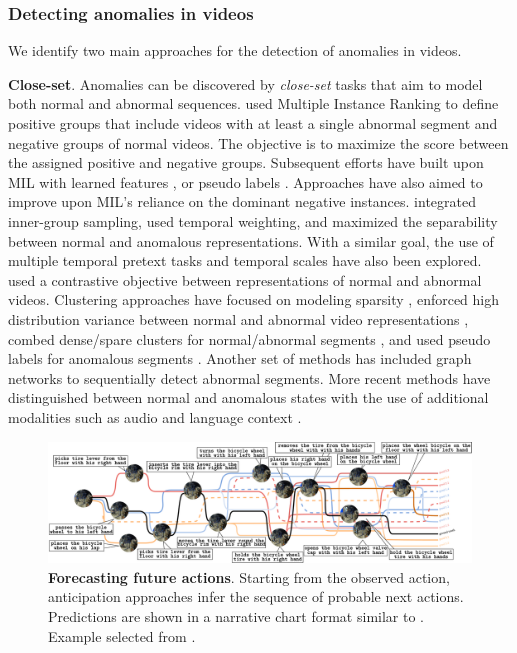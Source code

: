 \subsubsection{Detecting anomalies in videos}
\label{sec:prediction::VAD:::methods}


We identify two main approaches for the detection of anomalies in videos.

\noindent
\textbf{Close-set}. Anomalies can be discovered by \emph{close-set} tasks that aim to model both normal and abnormal sequences.  used Multiple Instance Ranking  to define positive groups that include videos with at least a single abnormal segment and negative groups of normal videos. The objective is to maximize the score between the assigned positive and negative groups. Subsequent efforts have built upon MIL with learned features , or pseudo labels . Approaches have also aimed to improve upon MIL's reliance on the dominant negative instances.  integrated inner-group sampling,  used temporal weighting, and  maximized the separability between normal and anomalous representations. With a similar goal, the use of multiple temporal pretext tasks  and temporal scales  have also been explored.  used a contrastive objective between representations of normal and abnormal videos. Clustering approaches have focused on modeling sparsity , enforced high distribution variance between normal and abnormal video representations , combed dense/spare clusters for normal/abnormal segments , and used pseudo labels for anomalous segments . Another set of methods  has included graph networks to sequentially detect abnormal segments. More recent methods have distinguished between normal and anomalous states with the use of additional modalities such as audio  and language context .


\begin{figure}[!ht]
    \centering
    \includegraphics[width=\linewidth,trim={0cm 0 0cm 0},clip]{figs/narrative_chart_ego_exo.pdf}
    \caption{\textbf{Forecasting future actions}. Starting from the observed action, anticipation approaches infer the sequence of probable next actions. Predictions are shown in a narrative chart format similar to .
    Example selected from .} 
    \label{fig:narration_chart}
\end{figure}


